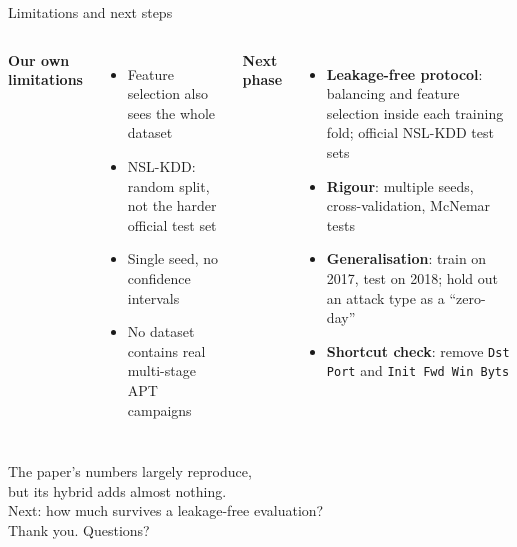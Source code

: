 \documentclass[aspectratio=169,11pt]{beamer}
\begin{document}
\begin{frame}{Limitations and next steps}
\begin{columns}[T]
\textcolor{warm}{\textbf{Our own limitations}}
\begin{itemize}\small
  \item Feature selection also sees the whole dataset
  \item NSL-KDD: random split, not the harder official test set
  \item Single seed, no confidence intervals
  \item No dataset contains real multi-stage APT campaigns
\end{itemize}
\textcolor{accent}{\textbf{Next phase}}
\begin{itemize}\small
  \item \textbf{Leakage-free protocol}: balancing and feature selection inside each training fold; official NSL-KDD
        test sets
  \item \textbf{Rigour}: multiple seeds, cross-validation, McNemar tests
  \item \textbf{Generalisation}: train on 2017, test on 2018; hold out an attack type as a ``zero-day''
  \item \textbf{Shortcut check}: remove \texttt{Dst Port} and \texttt{Init Fwd Win Byts}
\end{itemize}
\end{columns}
\end{frame}

\begin{frame}[standout]
The paper's numbers largely reproduce,\\
but its hybrid adds almost nothing.\\[10pt]
{\normalsize Next: how much survives a leakage-free evaluation?}\\[16pt]
Thank you. Questions?
\end{frame}
\end{document}
